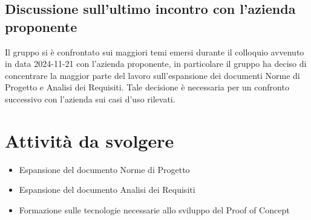 \documentclass[10pt]{article}
\begin{document}
    \subsection{Discussione sull'ultimo incontro con l'azienda proponente}
    Il gruppo si è confrontato sui maggiori temi emersi durante il colloquio avvenuto in data 2024-11-21 con l'azienda proponente, in particolare il gruppo ha deciso di concentrare la maggior parte del lavoro sull'espansione dei documenti Norme di Progetto e Analisi dei Requisiti.
    Tale decisione è necessaria per un confronto successivo con l'azienda sui casi d'uso rilevati.

    \section{Attività da svolgere}
    \begin{itemize}
        \item Espansione del documento Norme di Progetto
        \item Espansione del documento Analisi dei Requisiti
        \item Formazione sulle tecnologie necessarie allo sviluppo del Proof of Concept
    \end{itemize}



     
\end{document}
